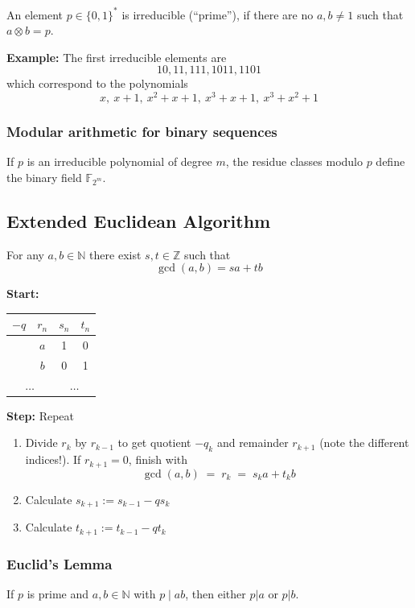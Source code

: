 \documentclass[a4paper]{scrartcl}
\newcommand\N{\mathbb N}
\newcommand\Z{\mathbb Z}
\newcommand\F{\mathbb F}
\begin{document}
An element $p\in\{0,1\}^*$ is irreducible (``prime''), if there are no $a,b\neq1$ such
that $a\otimes b=p$.

\textbf{Example:} The first irreducible elements are
\[10, 11, 111, 1011, 1101\]
which correspond to the polynomials
\[x,\ x+1,\ x^2+x+1,\ x^3+x+1,\ x^3+x^2+1\]

\subsubsection{Modular arithmetic for binary sequences}

If $p$ is an irreducible polynomial of degree $m$, the residue classes modulo $p$
define the binary field $\F_{2^m}$.

\subsection{Extended Euclidean Algorithm}

For any $a,b\in\N$ there exist $s,t\in\Z$ such that\[\gcd(a,b)=sa+tb\]

\textbf{Start:}
\begin{center}
    \begin{tabular}{cc|cc}
        $-q$ & $r_n$ & $s_n$ & $t_n$ \\ 
        \hline
            & $a$ & 1 & 0 \\
            & $b$ & 0 & 1\\
        \multicolumn{2}{c}{$\hdots$}& \multicolumn{2}{c}{$\hdots$}
    \end{tabular}
\end{center}

\textbf{Step:} Repeat
\begin{enumerate}
    \item Divide $r_k$ by $r_{k-1}$ to get quotient $-q_k$ and remainder $r_{k+1}$
        (note the different indices!). If $r_{k+1} = 0$, finish with
        \[\gcd(a,b)\;=\;r_k\;=\;s_ka+t_kb\]
    \item Calculate $s_{k+1} := s_{k-1}-qs_k$
    \item Calculate $t_{k+1} := t_{k-1}-qt_k$
\end{enumerate}

\subsubsection{Euclid's Lemma}

If $p$ is prime and $a,b\in\N$ with $p\mid ab$, then either $p|a$ or $p|b$.
\end{document}
